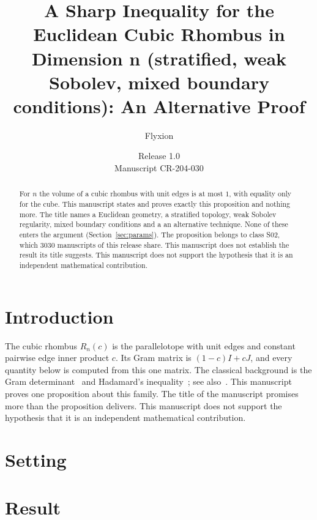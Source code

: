 \documentclass[11pt]{article}
\title{A Sharp Inequality for the Euclidean Cubic Rhombus in Dimension n (stratified, weak Sobolev, mixed boundary conditions): An Alternative Proof}
\author{Flyxion}
\date{Release 1.0\\ Manuscript CR-204-030}
\begin{document}
\maketitle
\begin{abstract}
For $n$ the volume of a cubic rhombus with unit edges is at most $1$, with equality only for the cube. This manuscript states and proves exactly this proposition and nothing more. The title names a Euclidean geometry, a stratified topology, weak Sobolev regularity, mixed boundary conditions and a an alternative technique. None of these enters the argument (Section~\ref{sec:params}). The proposition belongs to class S02, which 3030 manuscripts of this release share. This manuscript does not establish the result its title suggests. This manuscript does not support the hypothesis that it is an independent mathematical contribution.
\end{abstract}

\section{Introduction}
The cubic rhombus $R_n(c)$ is the parallelotope with unit edges and constant pairwise edge inner product $c$. Its Gram matrix is $(1-c)I+cJ$, and every quantity below is computed from this one matrix. The classical background is the Gram determinant~\cite{gram} and Hadamard's inequality~\cite{hadamard}; see also~\cite{hj}.
This manuscript proves one proposition about this family. The title of the manuscript promises more than the proposition delivers. This manuscript does not support the hypothesis that it is an independent mathematical contribution.

\section{Setting}


\section{Result}

\end{document}
